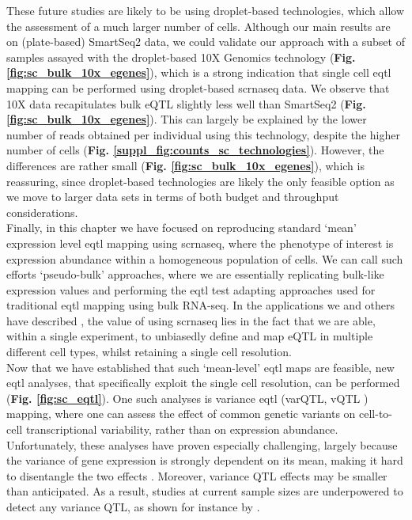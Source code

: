 These future studies are likely to be using droplet-based technologies, which allow the assessment of a much larger number of cells.
Although our main results are on (plate-based) SmartSeq2 data, we could validate our approach with a subset of samples assayed with the droplet-based 10X Genomics technology (\textbf{Fig. \ref{fig:sc_bulk_10x_egenes}}), which is a strong indication that single cell \gls{eqtl} mapping can be performed using droplet-based \gls{scrnaseq} data. 
We observe that 10X data recapitulates bulk eQTL slightly less well than SmartSeq2 (\textbf{Fig. \ref{fig:sc_bulk_10x_egenes}}).
This can largely be explained by the lower number of reads obtained per individual using this technology, despite the higher number of cells (\textbf{Fig. \ref{suppl_fig:counts_sc_technologies}}).
However, the differences are rather small (\textbf{Fig. \ref{fig:sc_bulk_10x_egenes}}), which is reassuring, since droplet-based technologies are likely the only feasible option as we move to larger data sets in terms of both budget and throughput considerations.\\

Finally, in this chapter we have focused on reproducing standard `mean' expression level \gls{eqtl} mapping using \gls{scrnaseq}, where the phenotype of interest is expression abundance within a homogeneous population of cells.
We can call such efforts `pseudo-bulk' approaches, where we are essentially replicating bulk-like expression values and performing the \gls{eqtl} test adapting approaches used for traditional \gls{eqtl} mapping using bulk RNA-seq. 
In the applications we and others have described \cite{van2018single,cuomo2020single}, the value of using \gls{scrnaseq} lies in the fact that we are able, within a single experiment, to unbiasedly define and map eQTL in multiple different cell types, whilst retaining a single cell resolution.\\

Now that we have established that such `mean-level' \gls{eqtl} maps are feasible, new \gls{eqtl} analyses, that specifically exploit the single cell resolution, can be performed (\textbf{Fig. \ref{fig:sc_eqtl}}).
One such analyses is variance \gls{eqtl} (varQTL, vQTL \cite{ayroles2015behavioral}) mapping, where one can assess the effect of common genetic variants on cell-to-cell transcriptional variability, rather than on expression abundance.
Unfortunately, these analyses have proven especially challenging, largely because the variance of gene expression is strongly dependent on its mean, making it hard to disentangle the two effects \cite{vallejos2016beyond}.
Moreover, variance QTL effects may be smaller than anticipated.
As a result, studies at current sample sizes are underpowered to detect any variance QTL, as shown for instance by \cite{sarkar2019discovery}. \\

